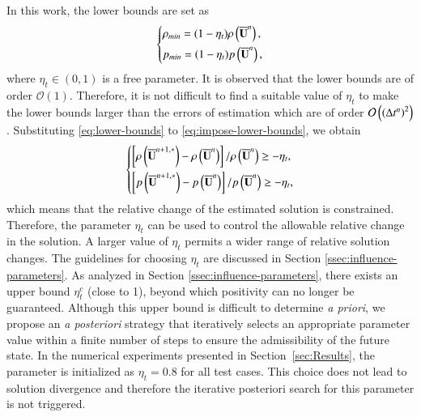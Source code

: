 In this work, the lower bounds are set as 
\begin{equation}
\label{eq:lower-bounds}
    \begin{dcases}
        \rho_{min}= (1-\eta_t) \rho \left(\overline{\mathbf{U}}^n\right), \\
        p_{min}= (1-\eta_t) p \left(\overline{\mathbf{U}}^n\right),
    \end{dcases}
\end{equation}
where $\eta_t \in (0,1)$ is a free parameter. It is observed that 
the lower bounds are of order $\mathcal{O}\left(1\right)$. Therefore,
it is not difficult to find a suitable value of $\eta_t$ to make the lower bounds larger than the errors of estimation which are of order $\mathcal{O}\left(\left(\mathrm\Delta t^n\right)^2\right)$. Substituting \eqref{eq:lower-bounds} to \eqref{eq:impose-lower-bounds}, we obtain
\begin{equation}
    \begin{dcases}
        \left[\rho \left(\overline{\mathbf{U}}^{n+1,*}\right)- \rho \left(\overline{\mathbf{U}}^n\right)\right]/\rho \left(\overline{\mathbf{U}}^n\right) \geq -\eta_t , \\
        \left[p \left(\overline{\mathbf{U}}^{n+1,*}\right)- p \left(\overline{\mathbf{U}}^n\right)\right]/p \left(\overline{\mathbf{U}}^n\right) \geq -\eta_t ,
    \end{dcases}
\end{equation}
which means that the relative change of the estimated solution is constrained. 
Therefore, the parameter $\eta_t$ can be used to control the allowable relative change in the solution. A larger value of $\eta_t$ permits a wider range of relative solution changes. The guidelines for choosing $\eta_t$ are discussed in Section \ref{ssec:influence-parameters}. As analyzed in Section \ref{ssec:influence-parameters}, there exists an upper bound $\eta_t^c$ (close to 1), beyond which positivity can no longer be guaranteed. Although this upper bound is difficult to determine \emph{a priori}, we propose an \emph{a posteriori} strategy that iteratively selects an appropriate parameter value within a finite number of steps to ensure the admissibility of the future state. In the numerical experiments presented in Section~\ref{sec:Results}, the parameter is initialized as $\eta_t = 0.8$ for all test cases. 
This choice does not lead to solution divergence and therefore the iterative posteriori search for this parameter is not triggered.

